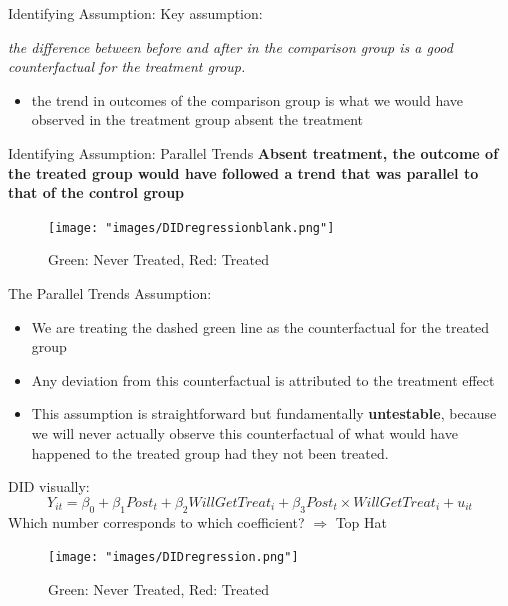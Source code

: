 \documentclass[
  ignorenonframetext,
]{beamer}
\providecommand{\tightlist}{%
  \setlength{\itemsep}{0pt}\setlength{\parskip}{0pt}}
\begin{document}
\begin{frame}{Identifying Assumption:}
\protect\hypertarget{identifying-assumption}{}
Key assumption:

\textit{the difference between before and after in the comparison group is a good counterfactual for the treatment group.}

\begin{itemize}
\tightlist
\item
  the trend in outcomes of the comparison group is what we would have
  observed in the treatment group absent the treatment
\end{itemize}
\end{frame}

\begin{frame}{Identifying Assumption: Parallel Trends}
\protect\hypertarget{identifying-assumption-parallel-trends}{}
\textbf{Absent treatment, the outcome of the treated group would have
followed a trend that was parallel to that of the control group}

\begin{figure}
\centering
\texttt{[image: "images/DIDregressionblank.png"]}
\caption{Green: Never Treated, Red: Treated}
\end{figure}
\end{frame}

\begin{frame}{The Parallel Trends Assumption:}
\protect\hypertarget{the-parallel-trends-assumption}{}
\begin{itemize}
\item
  We are treating the dashed green line as the counterfactual for the
  treated group
\item
  Any deviation from this counterfactual is attributed to the treatment
  effect
\item
  This assumption is straightforward but fundamentally
  \textbf{untestable}, because we will never actually observe this
  counterfactual of what would have happened to the treated group had
  they not been treated.
\end{itemize}
\end{frame}

\begin{frame}{DID visually:}
\protect\hypertarget{did-visually}{}
\[
Y_{it}=\beta_0+\beta_1 Post_t+\beta_2 WillGetTreat_i+\beta_3 Post_t\times WillGetTreat_i+u_{it}
\] Which number corresponds to which coefficient? \(\Rightarrow\) Top
Hat

\begin{figure}
\centering
\texttt{[image: "images/DIDregression.png"]}
\caption{Green: Never Treated, Red: Treated}
\end{figure}
\end{frame}
\end{document}
